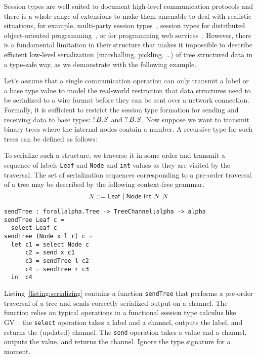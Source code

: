 Session types are well suited to document high-level communication
protocols and there is a whole range of extensions to make them
amenable to deal with realistic situations, for example, multi-party
session types~\cite{DBLP:conf/popl/HondaYC08}, session types for
distributed object-oriented
programming~\cite{DBLP:conf/popl/GayVRGC10}, or for programming web
services~\cite{DBLP:journals/toplas/CarboneHY12}. However, there is a
fundamental limitation in their structure that makes it impossible to
describe efficient low-level serialization (marshalling, pickling, \dots) of
tree structured data in a type-safe way, as we demonstrate with the
following example.

Let's assume that a single communication operation can only transmit a
label or a base type value to model the real-world restriction that
data structures need to be serialized to a wire format before they can
be sent over a network connection.  Formally, it is sufficient to
restrict the session type formation for sending and receiving data to
base types: $\textup{!}\,B.S$ and $\textup{?}\,B.S$. Now suppose we want to
transmit binary trees where the internal nodes contain a number.  A
recursive type for such trees can be defined as follows:

To serialize such a structure, we traverse it in some order and transmit a sequence of
labels \lstinline|Leaf| and \lstinline|Node| and \lstinline|int|
values as they are visited by the traversal. The set of serialization
sequences corresponding to a pre-order traversal of a tree
may be described by the following context-free grammar.
\begin{equation}\label{eq:1}
  N ::= \mathsf{Leaf} \mid \mathsf{Node}\ \mathsf{int}\ N\ N
\end{equation}
\begin{lstlisting}[float={t},captionpos={b},caption={Type-safe
    serialization of a binary tree},label={listing:serializing}]
sendTree : forallalpha.Tree -> TreeChannel;alpha -> alpha
sendTree Leaf c =
  select Leaf c
sendTree (Node x l r) c =
  let c1 = select Node c
      c2 = send x c1
      c3 = sendTree l c2
      c4 = sendTree r c3
  in  c4
\end{lstlisting}
Listing~\ref{listing:serializing}  contains a function \lstinline|sendTree| that
performs a pre-order traversal of a tree and sends correctly
serialized output on a channel.  The function relies on typical
operations in a functional session type calculus like
GV~\cite{DBLP:journals/jfp/GayV10}: the \lstinline|select| operation
takes a label and a channel, outputs the label, and returns the
(updated) channel. The \texttt{send} operation takes a value and a
channel, outputs the value, and returns the channel. Ignore the type
signature for a moment.

